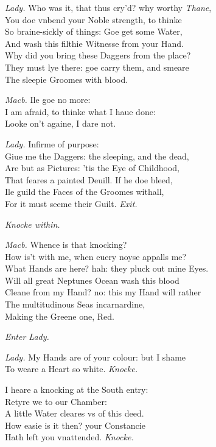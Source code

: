 \documentclass[12pt]{sides}
\newcommand{\clStageDir}[1]{\hspace*{\fill}\textit{#1}\hspace*{\fill}}
\newcommand{\elStageDir}[1]{\hfill\textit{#1}}
\newcommand{\dia}[1]{\hskip 15pt\textit{#1}\hskip 6pt}
\begin{document}
\begin{multicols}{2}
            \dia{Lady.} Who was it, that thus cry'd? why worthy \textit{Thane}, \\ You doe vnbend your Noble strength, to thinke \\ So braine-sickly of things: Goe get some Water, \\ And wash this filthie Witnesse from your Hand. \\ Why did you bring these Daggers from the place? \\ They must lye there: goe carry them, and smeare \\ The sleepie Groomes with blood.

            \dia{Macb.} Ile goe no more: \\ I am afraid, to thinke what I haue done: \\ Looke on't againe, I dare not.

            \dia{Lady.} Infirme of purpose: \\ Giue me the Daggers: the sleeping, and the dead, \\ Are but as Pictures: 'tis the Eye of Childhood, \\ That feares a painted Deuill. If he doe bleed, \\ Ile guild the Faces of the Groomes withall, \\ For it must seeme their Guilt. \clStageDir{Exit.}
            
            \elStageDir{Knocke within.} \hspace{32pt}

            \dia{Macb.} Whence is that knocking? \\ How is't with me, when euery noyse appalls me? \\ What Hands are here? hah: they pluck out mine Eyes. \\ Will all great Neptunes Ocean wash this blood \\ Cleane from my Hand? no: this my Hand will rather \\ The multitudinous Seas incarnardine, \\ Making the Greene one, Red.

            \clStageDir{Enter Lady.}
            
            \dia{Lady.} My Hands are of your colour: but I shame \\ To weare a Heart so white. \clStageDir{Knocke.} \hspace{1pt}

            I heare a knocking at the South entry: \\ Retyre we to our Chamber: \\ A little Water cleares vs of this deed. \\ How easie is it then? your Constancie \\ Hath left you vnattended. \clStageDir{Knocke.}
            

\end{multicols}
\end{document}
